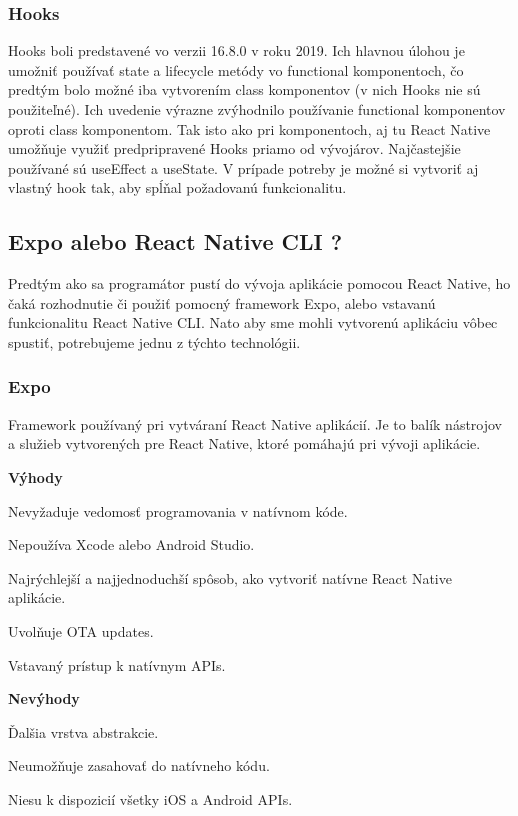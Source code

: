 \subsubsection{Hooks}
Hooks boli predstavené vo verzii 16.8.0 v roku 2019. Ich hlavnou úlohou je umožniť používať state a lifecycle metódy vo functional komponentoch, čo predtým bolo možné iba vytvorením class komponentov (v nich Hooks nie sú použiteľné). Ich uvedenie výrazne zvýhodnilo používanie functional komponentov oproti class komponentom. Tak isto ako pri komponentoch, aj tu React Native umožňuje využiť predpripravené Hooks priamo od vývojárov. Najčastejšie používané sú useEffect a useState. V prípade potreby je možné si vytvoriť aj vlastný hook tak, aby spĺňal požadovanú funkcionalitu.
\subsection{Expo alebo React Native CLI ?}
Predtým ako sa programátor pustí do vývoja aplikácie pomocou React Native, ho čaká rozhodnutie či použiť pomocný framework Expo, alebo vstavanú funkcionalitu React Native CLI. Nato aby sme mohli vytvorenú aplikáciu vôbec spustiť, potrebujeme jednu z týchto technológii. \\



\subsubsection{Expo}
Framework používaný pri vytváraní React Native aplikácií. Je to balík nástrojov a služieb vytvorených pre React Native, ktoré pomáhajú pri vývoji aplikácie. \newline

{\bf Výhody}
\begin{itemize}
{\item Nevyžaduje vedomosť programovania v natívnom kóde.}
{\item Nepoužíva Xcode alebo Android Studio.} 
{\item Najrýchlejší a najjednoduchší spôsob, ako vytvoriť natívne React Native aplikácie.}
{\item Uvolňuje OTA updates.} 
{\item Vstavaný prístup k natívnym APIs.}
\end{itemize}

{\bf Nevýhody}
\begin{itemize}
{\item Ďalšia vrstva abstrakcie.} 
{\item Neumožňuje zasahovať do natívneho kódu.}
{\item Niesu k dispozicií všetky iOS a Android APIs.} 
\end{itemize}
\bigskip

